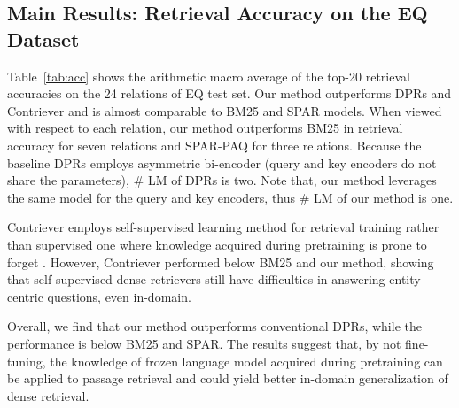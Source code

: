 \documentclass[letterpaper]{article} %
\begin{document}


\subsection{Main Results: Retrieval Accuracy on the EQ Dataset}\label{sec:results_eq}
Table~\ref{tab:acc} shows the arithmetic macro average of the top-20 retrieval accuracies on the 24 relations of EQ test set.
Our method outperforms DPRs and Contriever and is almost comparable to BM25 and SPAR models.
When viewed with respect to each relation, our method outperforms BM25 in retrieval accuracy for seven relations and SPAR-PAQ for three relations.
Because the baseline DPRs employs asymmetric bi-encoder (query and key encoders do not share the parameters), \# LM of DPRs is two.
Note that, our method leverages the same model for the query and key encoders, thus \# LM of our method is one.

Contriever employs self-supervised learning method for retrieval training rather than supervised one where knowledge acquired during pretraining is prone to forget \citep[e.g.,][]{zhou-srikumar-2022-closer}.
However, Contriever performed below BM25 and our method, showing that self-supervised dense retrievers still have difficulties in answering entity-centric questions, even in-domain.

Overall, we find that our method outperforms conventional DPRs, while the performance is below BM25 and SPAR.
The results suggest that, by not fine-tuning, the knowledge of frozen language model acquired during pretraining can be applied to passage retrieval and could yield better in-domain generalization of dense retrieval.


\end{document}
